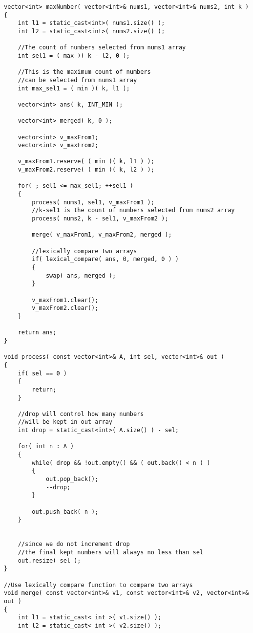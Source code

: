 \setcounter{lstlisting}{0}
\begin{lstlisting}[style=customc, caption={Greedy Approach}]
vector<int> maxNumber( vector<int>& nums1, vector<int>& nums2, int k )
{
    int l1 = static_cast<int>( nums1.size() );
    int l2 = static_cast<int>( nums2.size() );

    //The count of numbers selected from nums1 array
    int sel1 = ( max )( k - l2, 0 );

    //This is the maximum count of numbers
    //can be selected from nums1 array
    int max_sel1 = ( min )( k, l1 );

    vector<int> ans( k, INT_MIN );

    vector<int> merged( k, 0 );

    vector<int> v_maxFrom1;
    vector<int> v_maxFrom2;

    v_maxFrom1.reserve( ( min )( k, l1 ) );
    v_maxFrom2.reserve( ( min )( k, l2 ) );

    for( ; sel1 <= max_sel1; ++sel1 )
    {
        process( nums1, sel1, v_maxFrom1 );
        //k-sel1 is the count of numbers selected from nums2 array
        process( nums2, k - sel1, v_maxFrom2 );

        merge( v_maxFrom1, v_maxFrom2, merged );

        //lexically compare two arrays
        if( lexical_compare( ans, 0, merged, 0 ) )
        {
            swap( ans, merged );
        }

        v_maxFrom1.clear();
        v_maxFrom2.clear();
    }

    return ans;
}

void process( const vector<int>& A, int sel, vector<int>& out )
{
    if( sel == 0 )
    {
        return;
    }

    //drop will control how many numbers
    //will be kept in out array
    int drop = static_cast<int>( A.size() ) - sel;

    for( int n : A )
    {
        while( drop && !out.empty() && ( out.back() < n ) )
        {
            out.pop_back();
            --drop;
        }

        out.push_back( n );
    }


    //since we do not increment drop
    //the final kept numbers will always no less than sel
    out.resize( sel );
}

//Use lexically compare function to compare two arrays
void merge( const vector<int>& v1, const vector<int>& v2, vector<int>& out )
{
    int l1 = static_cast< int >( v1.size() );
    int l2 = static_cast< int >( v2.size() );


\end{lstlisting}
